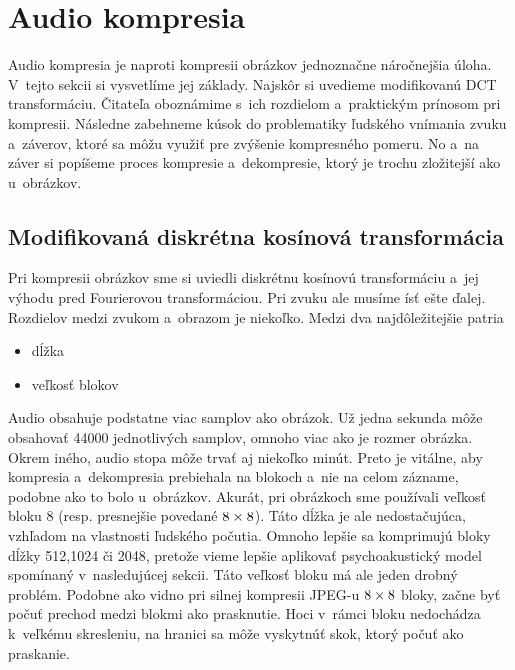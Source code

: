 \section{Audio kompresia}

Audio kompresia je naproti kompresii obrázkov jednoznačne náročnejšia
úloha. V~tejto sekcii si vysvetlíme jej základy. Najskôr si uvedieme
modifikovanú DCT transformáciu. Čitateľa oboznámime s~ich rozdielom 
a~praktickým prínosom pri kompresii. Následne zabehneme kúsok do
problematiky ľudského vnímania zvuku a~záverov, ktoré sa môžu využiť
pre zvýšenie kompresného pomeru. No a~na záver si popíšeme proces
kompresie a~dekompresie, ktorý je trochu zložitejší ako u~obrázkov.

\subsection{Modifikovaná diskrétna kosínová transformácia}
Pri kompresii obrázkov sme si uviedli diskrétnu kosínovú
transformáciu a~jej výhodu pred Fourierovou transformáciou. Pri zvuku
ale musíme ísť ešte ďalej. Rozdielov medzi zvukom a~obrazom je
niekoľko. Medzi dva najdôležitejšie patria
\begin{itemize}
\item dĺžka
\item veľkosť blokov
\end{itemize}
Audio obsahuje podstatne viac samplov ako obrázok. Už jedna sekunda
môže obsahovať 44000 jednotlivých samplov, omnoho viac ako je rozmer
obrázka. Okrem iného, audio stopa môže trvať aj niekoľko minút. Preto
je vitálne, aby kompresia a~dekompresia prebiehala na blokoch a~nie na
celom zázname, podobne ako to bolo u~obrázkov. Akurát, pri obrázkoch
sme používali veľkosť bloku 8 (resp. presnejšie povedané $8\times8$). Táto
dĺžka je ale nedostačujúca, vzhľadom na vlastnosti ľudského počutia.
Omnoho lepšie sa komprimujú bloky dĺžky 512,1024 či 2048, pretože
vieme lepšie aplikovať psychoakustický model spomínaný v~nasledujúcej
sekcii. Táto veľkosť bloku má ale jeden drobný problém. Podobne ako
vidno pri silnej kompresii JPEG-u $8\times8$ bloky, začne byť počuť prechod
medzi blokmi ako prasknutie. Hoci v~rámci bloku nedochádza k~veľkému
skresleniu, na hranici sa môže vyskytnúť skok, ktorý počuť ako
praskanie.

